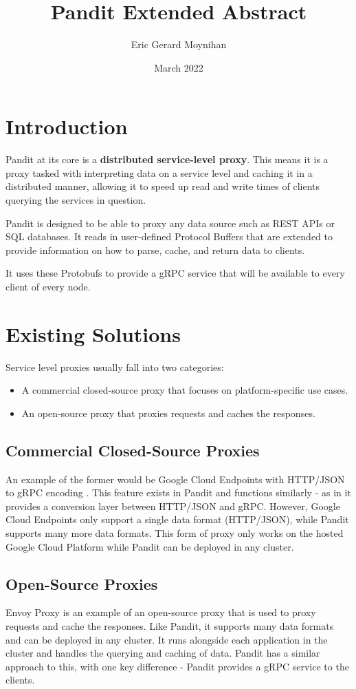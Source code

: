 \documentclass[a4paper]{article}
\title{Pandit Extended Abstract}
\author{Eric Gerard Moynihan}
\date{March 2022}
\begin{document}
\maketitle

\section{Introduction}
Pandit at its core is a \textbf{distributed service-level proxy}.
This means it is a proxy tasked with interpreting data on a service level and caching it
in a distributed manner, allowing it to speed up read and write times of clients querying the services
in question.

Pandit is designed to be able to proxy any data source such as REST APIs or SQL databases.
It reads in user-defined Protocol Buffers \cite{protobufs} that are extended to provide information on
how to parse, cache, and return data to clients.

It uses these Protobufs to provide a gRPC \cite{grpc} service that will be available to every client of every node.


\section{Existing Solutions}
Service level proxies usually fall into two categories:
\begin{itemize}
    \item A commercial closed-source proxy that focuses on platform-specific use cases.
    \item An open-source proxy that proxies requests and caches the responses.
\end{itemize}
\subsection{Commercial Closed-Source Proxies}
An example of the former would be Google Cloud Endpoints with HTTP/JSON to gRPC encoding \cite{cloud_endpoints}.
This feature exists in Pandit and functions similarly - as in it provides a conversion layer between
HTTP/JSON and gRPC. However, Google Cloud Endpoints only support a single data format (HTTP/JSON), while Pandit supports
many more data formats.
This form of proxy only works on the hosted Google Cloud Platform \cite{google_cloud_platform} while Pandit can be deployed
in any cluster.

\subsection{Open-Source Proxies}
Envoy Proxy \cite{envoy} is an example of an open-source proxy that is used to proxy requests and cache the responses.
Like Pandit, it supports many data formats and can be deployed in any cluster.
It runs alongside each application in the cluster and handles the querying and caching of data.
Pandit has a similar approach to this, with one key difference - Pandit provides a gRPC service to the clients.
\end{document}
